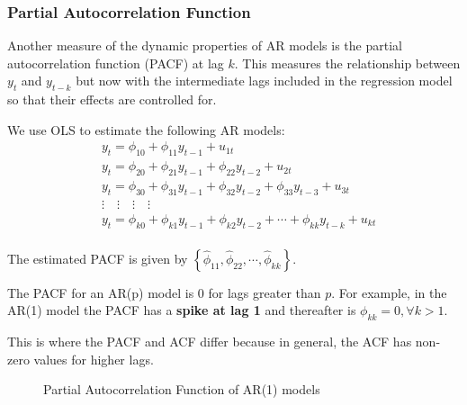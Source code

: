 \documentclass[11pt]{article}
\begin{document}
\subsubsection{Partial Autocorrelation Function}

Another measure of the dynamic properties of AR models is the partial autocorrelation function (PACF) at lag $k$. This measures the relationship between $y_t$ and $y_{t-k}$ but now with the intermediate lags included in the regression model so that their effects are controlled for. 

We use OLS to estimate the following AR models:
\begin{equation}
\label{PACF estimation equations}
\begin{aligned}
& y_t=\phi_{10}+\phi_{11} y_{t-1}+u_{1 t} \\
& y_t=\phi_{20}+\phi_{21} y_{t-1}+\phi_{22} y_{t-2}+u_{2 t} \\
& y_t=\phi_{30}+\phi_{31} y_{t-1}+\phi_{32} y_{t-2}+\phi_{33} y_{t-3}+u_{3 t} \\
& \vdots \quad \vdots \quad \vdots \quad \vdots \\
& y_t=\phi_{k 0}+\phi_{k 1} y_{t-1}+\phi_{k 2} y_{t-2}+\cdots+\phi_{k k} y_{t-k}+u_{k t} \\
&
\end{aligned}
\end{equation}

The estimated PACF is given by $\left\{\widehat{\phi}_{11}, \widehat{\phi}_{22}, \cdots, \widehat{\phi}_{k k}\right\}$.

The PACF for an AR(p) model is 0 for lags greater than $p$. For example, in the AR(1) model the PACF has a \textbf{spike at lag 1} and thereafter is $\phi_{kk}=0, \forall k>1$.

This is where the PACF and ACF differ because in general, the ACF has non-zero values for higher lags.

\begin{figure}[h]
    \centering
    \qquad
    \caption{Partial Autocorrelation Function of AR(1) models}%
    \label{fig:positive negative pacf}%
\end{figure}
\end{document}
